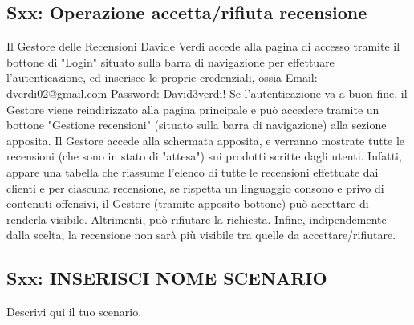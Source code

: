 \documentclass[12pt, a4paper, oneside]{book}
\begin{document}
    \subsection*{Sxx: Operazione accetta/rifiuta recensione}
    Il Gestore delle Recensioni Davide Verdi accede alla pagina di accesso tramite il bottone di "Login" situato sulla barra di navigazione per effettuare l'autenticazione, ed inserisce le proprie credenziali, ossia Email: dverdi02@gmail.com Password: David3verdi!
    Se l'autenticazione va a buon fine, il Gestore viene reindirizzato alla pagina principale e può accedere tramite un bottone "Gestione recensioni" (situato sulla barra di navigazione) alla sezione apposita.
    Il Gestore accede alla schermata apposita, e verranno mostrate tutte le recensioni (che sono in stato di "attesa") sui prodotti scritte dagli utenti. Infatti, appare una tabella che riassume l'elenco di tutte le recensioni effettuate dai clienti e per ciascuna recensione, se rispetta un linguaggio consono e privo di contenuti offensivi, il Gestore (tramite apposito bottone) può accettare di renderla visibile. Altrimenti, può rifiutare la richiesta.
    Infine, indipendemente dalla scelta, la recensione non sarà più visibile tra quelle da accettare/rifiutare.

    \subsection*{Sxx: INSERISCI NOME SCENARIO}
        Descrivi qui il tuo scenario.
\end{document}
